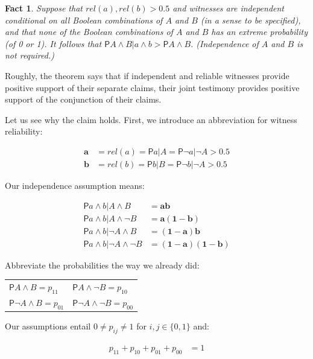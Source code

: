 \documentclass[10pt,dvipsnames,enabledeprecatedfontcommands]{scrartcl}
\newtheorem{fact}{Fact}
\newcommand{\n}{\neg}
\newcommand{\et}{\wedge}
\newcommand{\pr}{\mathsf{P}}
\begin{document}
\begin{fact}\label{ther:increase}
Suppose that  $rel(a),rel(b)>0.5$ and witnesses are independent conditional on all Boolean combinations of $A$ and $B$  (in a sense to be specified), and that none of the Boolean combinations of $A$ and $B$ has an extreme probability (of 0 or 1). It follows that  $\pr{A\et B \vert a\et b}>\pr{A\et B}$. (Independence of $A$ and $B$ is not required.)
\end{fact}

Roughly, the theorem says that if independent and reliable witnesses
provide positive support of their separate claims, their joint testimony
provides positive support of the conjunction of their claims.

Let us see why the claim holds. First, we introduce an abbreviation for
witness reliability:

\begin{align*}\mathbf{a} &=rel(a)=\pr{a\vert A}=\pr{\n a\vert \n A}>0.5\\ 
\mathbf{b} &=rel(b)=\pr{b\vert B}=\pr{\n b\vert \n A}>0.5
\end{align*}

Our independence assumption means:

\begin{align*}
\pr{a\et b \vert A\et B}  &= \mathbf{ab}\\
\pr{a\et b \vert A\et \n B} & = \mathbf{a(1-b)}\\
\pr{a\et b \vert \n A\et B}  & = \mathbf{(1-a)b}\\
\pr{a\et b \vert \n A\et \n  B}  & = \mathbf{(1-a)(1-b)}
\end{align*}

\vspace{-2mm}

Abbreviate the probabilities the way we already did:

\begin{center}
\begin{tabular}{ll}
$\pr{A\et B} = p_{11}$ & $\pr{A\et \n B} = p_{10}$\\
$\pr{\n A \et B} = p_{01}$ & $\pr{\n A \et \n B}=p_{00}$
\end{tabular}
\end{center}

Our assumptions entail \(0\neq p_{ij}\neq 1\) for \(i,j\in \{0,1\}\)
and:

\begin{align}\label{eq:sumupto1}
p_{11}+p_{10}+p_{01}+p_{00}&=1
\end{align}
\end{document}
